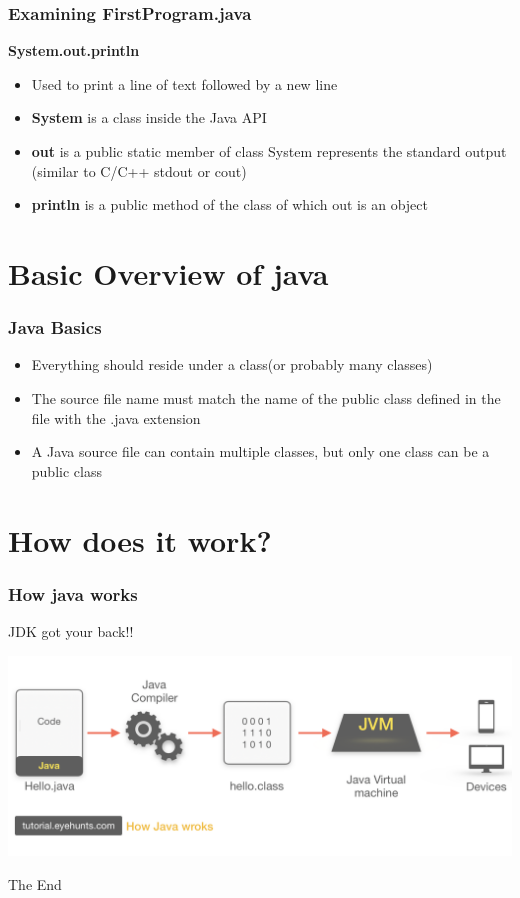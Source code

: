 \documentclass{beamer}
\begin{document}

\begin{frame}
\frametitle{Examining FirstProgram.java}
\textbf{System.out.println}
\begin{itemize}
\item Used to print a line of text followed by a new line
\item \textbf{System}  is a class inside the Java API
\item \textbf{out} is a public static member of class System
represents the standard output (similar to C/C++ stdout or cout)
\item\textbf{println} is a public method of the class of which out is an object
\end{itemize}
\end{frame}

\section{Basic Overview of java}

\begin{frame}
\frametitle{Java Basics}
\begin{itemize}
\item Everything should reside under a class(or probably many classes)
\item The source file name must match the name of the public class defined in the file with the .java extension
\item A Java source file can contain multiple classes, but only one class can be a public class

\end{itemize}
\end{frame}


\section{How does it work?}

\begin{frame}
\frametitle{How java works}
\huge{\centerline{JDK got your back!!}}
\includegraphics[width=\textwidth]{howitworks.png}
\end{frame}



\begin{frame}
\Huge{\centerline{The End}}
\end{frame}

\end{document}
